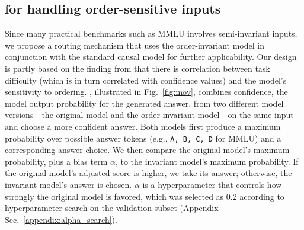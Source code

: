 \subsection{\sr{} for handling order-sensitive inputs}
\label{sec:mov}

Since many practical benchmarks such as MMLU involves semi-invariant inputs, %
we propose a routing mechanism that uses the order-invariant model in conjunction with the standard causal model for further applicability. 
Our design is partly based on the finding from
\citet{wei2024unveilingselectionbiasesexploring} that there is correlation between task difficulty (which is in turn correlated with confidence values) and the model's sensitivity to ordering.
\sr{}, illustrated in Fig.~\ref{fig:mov}, combines confidence, the model output probability for the generated answer, from two different model versions---the original model and the order-invariant model---on the same input and choose a more confident answer. 
Both models first produce a maximum probability over possible answer tokens (e.g., \texttt{A, B, C, D} for MMLU) and a corresponding answer choice. We then compare the original model’s maximum probability, plus a bias term $\alpha$, to the invariant model’s maximum probability. If the original model’s adjusted score is higher, we take its answer; otherwise, the invariant model’s answer is chosen.
$\alpha$ is a hyperparameter that controls how strongly the original model is favored, which was selected as 0.2 according to hyperparameter search on the validation subset (Appendix Sec.~\ref{appendix:alpha_search}).

